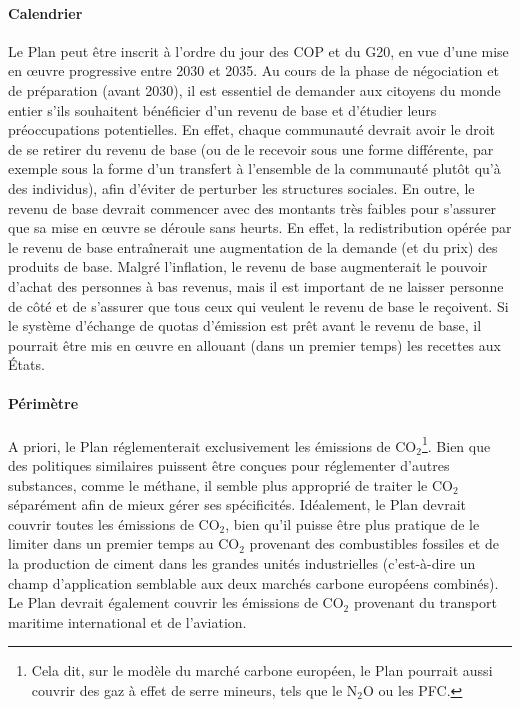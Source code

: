 \documentclass[a5paper,french,openany]{memoir}
\begin{document}
\paragraph{Calendrier} 
Le Plan peut être inscrit à l'ordre du jour des COP et du G20, en vue d'une mise en œuvre progressive entre 2030 et 2035. Au cours de la phase de négociation et de préparation (avant 2030), il est essentiel de demander aux citoyens du monde entier s'ils souhaitent bénéficier d'un revenu de base et d'étudier leurs préoccupations potentielles. En effet, chaque communauté devrait avoir le droit de se retirer du revenu de base (ou de le recevoir sous une forme différente, par exemple sous la forme d'un transfert à l'ensemble de la communauté plutôt qu'à des individus), afin d'éviter de perturber les structures sociales. En outre, le revenu de base devrait commencer avec des montants très faibles pour s'assurer que sa mise en œuvre se déroule sans heurts. En effet, la redistribution opérée par le revenu de base entraînerait une augmentation de la demande (et du prix) des produits de base. Malgré l'inflation, le revenu de base augmenterait le pouvoir d'achat des personnes à bas revenus, mais il est important de ne laisser personne de côté et de s'assurer que tous ceux qui veulent le revenu de base le reçoivent. Si le système d'échange de quotas d'émission est prêt avant le revenu de base, il pourrait être mis en œuvre en allouant (dans un premier temps) les recettes aux États.

\paragraph{Périmètre} 
A priori, le Plan réglementerait exclusivement les émissions de CO$_\text{2}$\footnote{Cela dit, sur le modèle du marché carbone européen, le Plan pourrait aussi couvrir des gaz à effet de serre mineurs, tels que le N$_\text{2}$O ou les PFC.}. Bien que des politiques similaires puissent être conçues pour réglementer d'autres substances, comme le méthane, il semble plus approprié de traiter le CO$_\text{2}$ séparément afin de mieux gérer ses spécificités. Idéalement, le Plan devrait couvrir toutes les émissions de CO$_\text{2}$, bien qu'il puisse être plus pratique de le limiter dans un premier temps au CO$_\text{2}$ provenant des combustibles fossiles et de la production de ciment dans les grandes unités industrielles (c'est-à-dire un champ d'application semblable aux deux marchés carbone européens combinés). Le Plan devrait également couvrir les émissions de CO$_\text{2}$ provenant du transport maritime international et de l'aviation. 
\end{document}
